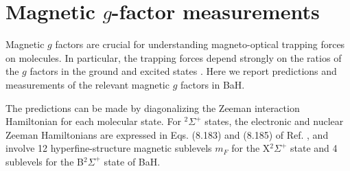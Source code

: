 \documentclass[amsmath,amssymb,aps,twocolumn,longbibliography,notitlepage]{revtex4-1}
\newcommand{\tj}[9]{ \begin{pmatrix}
  #1 & #2 & #3 \\
  #4 & #5 & #6
 \end{pmatrix}}
\newcommand{\Gj}[6]{ \begin{Bmatrix}
  #1 & #2 & #3 \\
  #4 & #5 & #6
 \end{Bmatrix}}
\begin{document}
\section{Magnetic $g$-factor measurements}
\label{sec:gFactors}

Magnetic $g$ factors are crucial for understanding magneto-optical trapping forces on molecules.  In particular, the trapping forces depend strongly on the ratios of the $g$ factors in the ground and excited states \cite{TarbuttNJP15_ComplexLevelMOT}.  Here we report predictions and measurements of the relevant magnetic $g$ factors in BaH.

The predictions can be made by diagonalizing the Zeeman interaction Hamiltonian for each molecular state.  For $^2\Sigma^+$ states, the electronic and nuclear Zeeman Hamiltonians are expressed in Eqs. (8.183) and (8.185) of Ref. \cite{BrownCarrington}, and involve 12 hyperfine-structure magnetic sublevels $m_F$ for the X$^2\Sigma^+$ state and 4 sublevels for the B$^2\Sigma^+$ state of BaH.
\begin{comment}
as,
\begin{equation}
\begin{split}
\langle\eta&,\Lambda;N,S,J,I,F,m_F|\mathbf{\mu_H}\cdot \mathbf{B}|\eta,\Lambda;N,S,J',I,F',m_F\rangle\\
 &=B_z \mu_B g_s (-1)^{F-m_f}\tj{F}{1}{F'}{-m_F}{0}{m_F}... (-1)^{F'+J+1+I}\\
 &\times [(2F'+1)(2F+1)]^{1/2}\Gj{F}{J}{I}{J\rq}{F'}{1}(-1)^{J+N+1+S}\\
 &\times [(2J\rq+1)(2J+1)]^{1/2}\Gj{J}{S}{N}{S}{J\rq}{1}\\
 &\times [S(S+1)(2S+1)]^{1/2} - g_I B_z \mu_B (-1)^{F-m_f}\\
 &\times \tj{F}{1}{F'}{-m_F}{0}{m_F}...(-1)^{F+J+1+I}\\
 &\times [(2F'+1)(2F+1)]^{1/2}\Gj{F}{I}{J}{I}{F'}{1}\\
 &\times [I(I+1)(2I+1)]^{1/2}.
\end{split}
\end{equation}
\end{comment}
\end{document}
